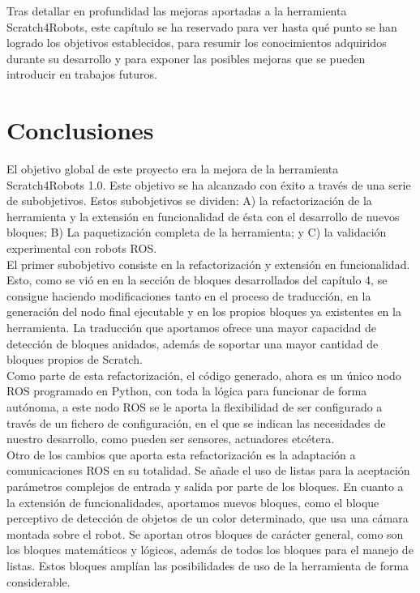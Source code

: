 Tras detallar en profundidad las mejoras aportadas a la herramienta Scratch4Robots,  este capítulo se ha reservado para ver hasta qué punto se han logrado los objetivos establecidos, para resumir los conocimientos adquiridos durante su desarrollo y para exponer las posibles mejoras que se pueden introducir en trabajos futuros.

\section{Conclusiones}
\label{sec:conclusiones}

El objetivo global de este proyecto era la mejora de la herramienta Scratch4Robots 1.0. Este objetivo se ha alcanzado con éxito a través de una serie de subobjetivos. Estos subobjetivos se dividen: A) la refactorización de la herramienta y la extensión en funcionalidad de ésta con el desarrollo de nuevos bloques; B) La paquetización completa de la herramienta; y C) la validación experimental con robots ROS.\\

El primer subobjetivo consiste en la refactorización y extensión en funcionalidad. Esto, como se vió en en la sección de bloques desarrollados del capítulo 4, se consigue haciendo modificaciones tanto en el proceso de traducción, en la generación del nodo final ejecutable y en los propios bloques ya existentes en la herramienta. La traducción que aportamos ofrece una mayor capacidad de detección de bloques anidados, además de soportar una mayor cantidad de bloques propios de Scratch. \\

Como parte de esta refactorización, el código generado, ahora es un único nodo ROS programado en Python, con toda la lógica para funcionar de forma autónoma, a este nodo ROS se le aporta la flexibilidad de ser configurado a través de un fichero de configuración, en el que se indican las necesidades de nuestro desarrollo, como pueden ser sensores, actuadores etcétera. \\

Otro de los cambios que aporta esta refactorización es la adaptación a comunicaciones ROS en su totalidad. Se añade el uso de listas para la aceptación parámetros complejos de entrada y salida por parte de los bloques. En cuanto a la extensión de funcionalidades, aportamos nuevos bloques, como el bloque perceptivo de detección de objetos de un color determinado, que usa una cámara montada sobre el robot. Se aportan otros bloques de carácter general, como son los bloques matemáticos y lógicos, además de todos los bloques para el manejo de listas. Estos bloques amplían las posibilidades de uso de la herramienta de forma considerable.\\

